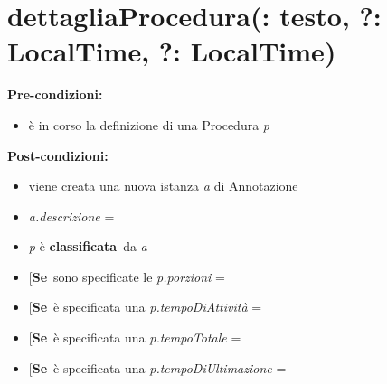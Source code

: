 \section[dettagliaProcedura]{\texorpdfstring{dettagliaProcedura(: testo, }
 
{?: LocalTime, } {?: LocalTime)}}\label{h.rc4f999olfrs}
\textbf{Pre-condizioni:}
\begin{itemize}[label=$-$, noitemsep]
	\item {è in corso la definizione di una Procedura }\textit{p}
\end{itemize}
\textbf{Post-condizioni:}
\begin{itemize}[label=$-$, noitemsep]
	\item {viene creata una nuova istanza }\textit{a }{di Annotazione}
	\item \textit{a.descrizione }{= }
	\item \textit{p }{è }\textbf{classificata}{~da }\textit{a}
	\item {{[}}\textbf{Se}{~sono specificate le }\myuline{porzioni}{{]} }\textit{p.porzioni }{= }
	\item {{[}}\textbf{Se}{~è specificata una }\myuline{tAttività}{{]} }\textit{p.tempoDiAttività }{= }
	\item {{[}}\textbf{Se}{~è specificata una }\myuline{tTotale}{{]} }\textit{p.tempoTotale }{= }
	\item {{[}}\textbf{Se}{~è specificata una }\myuline{tUltimazione}{{]} }\textit{p.tempoDiUltimazione }{= }
\end{itemize}

